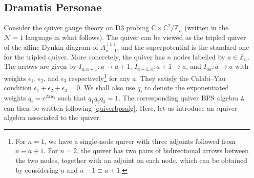 \documentclass[11pt]{article}
\numberwithin{equation}{section}
\numberwithin{figure}{section}
\numberwithin{table}{section}
\newcommand{\ii}{\mathrm{i}}
\begin{document}
\subsection{Dramatis Personae}\label{def}
Consider the quiver gauge theory on D3 probing $\mathbb{C}\times\mathbb{C}^2/\mathbb{Z}_n$ (written in the $\mathcal{N}=1$ language in what follows). The quiver can be viewed as the tripled quiver of the affine Dynkin diagram of $A^{(1)}_{n-1}$, and the superpotential is the standard one for the tripled quiver. More concretely, the quiver has $n$ nodes labelled by $a\in\mathbb{Z}_n$. The arrows are given by $I_{a,a+1}:a\rightarrow a+1$, $I_{a+1,a}:a+1\rightarrow a$, and $I_{aa}:a\rightarrow a$ with weights $\epsilon_1$, $\epsilon_2$, and $\epsilon_3$ respectively\footnote{For $n=1$, we have a single-node quiver with three adjoints followed from $a\equiv a+1$. For $n=2$, the quiver has two pairs of bidirectional arrows between the two nodes, together with an adjoint on each node, which can be obtained by considering $a$ and $a-1\equiv a+1$.} for any $a$. They satisfy the Calabi--Yau condition $\epsilon_1+\epsilon_2+\epsilon_3=0$. We shall also use $q_i$ to denote the exponentiated weights $q_i=\mathrm{e}^{2\pi\ii\epsilon_i}$ such that $q_1q_2q_3=1$. The corresponding quiver BPS algebra $\mathtt{A}$ can then be written following \cref{quiverbpsalg}. Here, let us introduce an $\iota$quiver algebra associated to the quiver.
\end{document}
